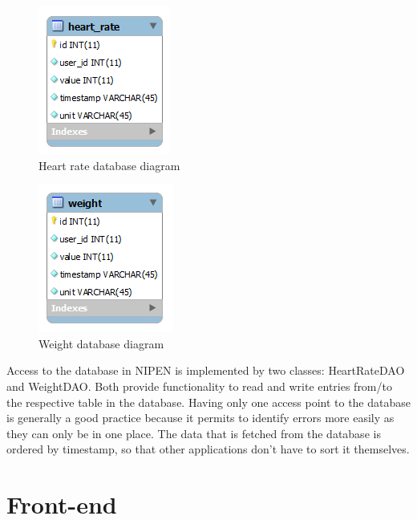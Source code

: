 \begin{figure}[h]
\centering
\includegraphics[scale=1.0]{../Figures/heart-rate-database-diagram.png}
\caption{Heart rate database diagram}
\label{figure:heart-rate-database-diagram}
\end{figure}

\begin{figure}[h]
\centering
\includegraphics[scale=1.0]{../Figures/weight-database-diagram.png}
\caption{Weight database diagram}
\label{figure:weight-database-diagram}
\end{figure}

Access to the database in NIPEN is implemented by two classes: HeartRateDAO and WeightDAO.
Both provide functionality to read and write entries from/to the respective table in the database.
Having only one access point to the database is generally a good practice because it permits to
identify errors more easily as they can only be in one place.
The data that is fetched from the database is ordered by timestamp, so that other applications
don't have to sort it themselves.



\section{Front-end}
\label{subsec:front-end}

